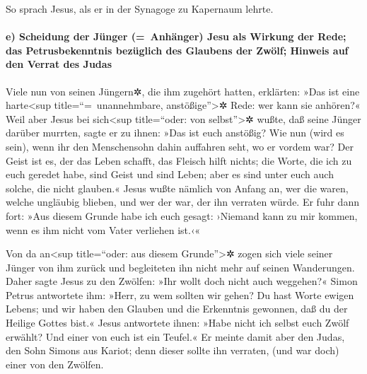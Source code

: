  So sprach Jesus, als er in der Synagoge zu Kapernaum
lehrte.

\hypertarget{e-scheidung-der-juxfcnger-anhuxe4nger-jesu-als-wirkung-der-rede-das-petrusbekenntnis-bezuxfcglich-des-glaubens-der-zwuxf6lf-hinweis-auf-den-verrat-des-judas}{%
\paragraph{e) Scheidung der Jünger (=~Anhänger) Jesu als Wirkung der
Rede; das Petrusbekenntnis bezüglich des Glaubens der Zwölf; Hinweis auf
den Verrat des
Judas}\label{e-scheidung-der-juxfcnger-anhuxe4nger-jesu-als-wirkung-der-rede-das-petrusbekenntnis-bezuxfcglich-des-glaubens-der-zwuxf6lf-hinweis-auf-den-verrat-des-judas}}

 Viele nun von seinen Jüngern✲, die ihm zugehört hatten,
erklärten: »Das ist eine harte\textless sup title=``=~unannehmbare,
anstößige''\textgreater✲ Rede: wer kann sie anhören?« 
Weil aber Jesus bei sich\textless sup title=``oder: von
selbst''\textgreater✲ wußte, daß seine Jünger darüber murrten, sagte er
zu ihnen: »Das ist euch anstößig?  Wie nun (wird es
sein), wenn ihr den Menschensohn dahin auffahren seht, wo er vordem war?
 Der Geist ist es, der das Leben schafft, das Fleisch
hilft nichts; die Worte, die ich zu euch geredet habe, sind Geist und
sind Leben;  aber es sind unter euch auch solche, die
nicht glauben.« Jesus wußte nämlich von Anfang an, wer die waren, welche
ungläubig blieben, und wer der war, der ihn verraten würde.
 Er fuhr dann fort: »Aus diesem Grunde habe ich euch
gesagt: ›Niemand kann zu mir kommen, wenn es ihm nicht vom Vater
verliehen ist.‹«

 Von da an\textless sup title=``oder: aus diesem
Grunde''\textgreater✲ zogen sich viele seiner Jünger von ihm zurück und
begleiteten ihn nicht mehr auf seinen Wanderungen.  Daher
sagte Jesus zu den Zwölfen: »Ihr wollt doch nicht auch weggehen?«
 Simon Petrus antwortete ihm: »Herr, zu wem sollten wir
gehen? Du hast Worte ewigen Lebens;  und wir haben den
Glauben und die Erkenntnis gewonnen, daß du der Heilige Gottes bist.«
 Jesus antwortete ihnen: »Habe nicht ich selbst euch
Zwölf erwählt? Und einer von euch ist ein Teufel.«  Er
meinte damit aber den Judas, den Sohn Simons aus Kariot; denn dieser
sollte ihn verraten, (und war doch) einer von den Zwölfen.

